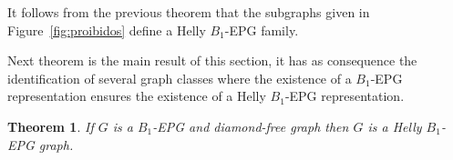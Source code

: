 \documentclass[9pt]{entcs}
\newtheorem{teo}{Theorem}[section]
\begin{document}



It follows from the previous theorem that the subgraphs given in Figure~\ref{fig:proibidos} define a Helly $B_1$-EPG family.







Next theorem is the main result of this section, it has as consequence the identification of several graph classes where the existence of a $B_1$-EPG representation ensures the existence of a Helly $B_1$-EPG representation.


\begin{teo} \label{lem:b1DiamondFree}
 If $G$ is a $B_1$-EPG and diamond-free graph then $G$ is a Helly $B_1$-EPG graph.
 \end{teo}
\end{document}
